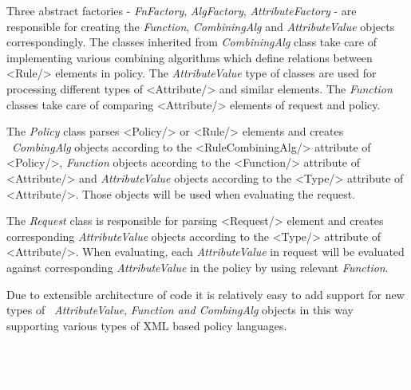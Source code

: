 \documentclass{article}
\begin{document}
{\upshape\color{black}
Three abstract factories - \textit{FnFactory}, \textit{AlgFactory},
\textit{AttributeFactory} - are responsible for creating the
\textit{Function}, \textit{CombiningAlg} and \textit{AttributeValue}
objects correspondingly. The classes inherited from
\textit{CombiningAlg} class take care of implementing various combining
algorithms which define relations between
{\textless}Rule/{\textgreater} elements in policy. The
\textit{AttributeValue} type of classes are used for processing
different types of {\textless}Attribute/{\textgreater} and similar
elements. The \textit{Function} classes take care of comparing
{\textless}Attribute/{\textgreater} elements of request and policy. }

{\upshape\color{black}
The \textit{Policy} class parses {\textless}Policy/{\textgreater} or
{\textless}Rule/{\textgreater} elements and creates
\ \textit{CombingAlg} objects according to the
{\textless}RuleCombiningAlg/{\textgreater} attribute of
{\textless}Policy/{\textgreater}, \textit{Function} objects according
to the {\textless}Function/{\textgreater} attribute of
{\textless}Attribute/{\textgreater} and \textit{AttributeValue} objects
according to the {\textless}Type/{\textgreater} attribute of
{\textless}Attribute/{\textgreater}. Those objects will be used when
evaluating the request.}

{\upshape\color{black}
The \textit{Request} class is responsible for parsing
{\textless}Request/{\textgreater} element and creates corresponding
\textit{AttributeValue} objects according to the
{\textless}Type/{\textgreater} attribute of
{\textless}Attribute/{\textgreater}. When evaluating, each
\textit{AttributeValue} in request will be evaluated against
corresponding \textit{AttributeValue} in the policy by using relevant
\textit{Function}.}

{\upshape\color{black}
Due to extensible architecture of code it is relatively easy to add
support for new types of \ \textit{AttributeValue}, \textit{Function
and CombingAlg} objects in this way supporting various types of XML
based policy languages.}


\includegraphics[width=0.0161in,height=0.0161in]{SecurityFrameworkofARC1-img3.png}

\includegraphics[width=0.0161in,height=0.0161in]{SecurityFrameworkofARC1-img4.png}
\end{document}
